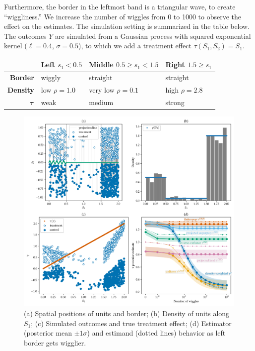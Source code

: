 \documentclass[letter]{article}
\makeatletter
\def\maxwidth{\ifdim\Gin@nat@width>\linewidth\linewidth
\else\Gin@nat@width\fi}
\let\Oldincludegraphics\includegraphics
\renewcommand{\includegraphics}[1]{\Oldincludegraphics[width=.8\maxwidth]{#1}}
\newcommand{\taubold}{\bm{\tau}}
\makeatother
\begin{document}
Furthermore, the border in the leftmost band is a triangular wave, to create ``wiggliness.''
We increase the number of wiggles from 0 to 1000 to observe the effect on the estimates.
The simulation setting is summarized in the table below.
The outcomes \(Y\) are simulated from a Gaussian process with squared exponential kernel
(\(\ell=0.4\), \(\sigma=0.5\)), to which we add a treatment effect \(\tau(S_1, S_2) = S_1\).
    


    	\begin{longtable}[]{@{}rlll@{}}
\toprule
& Left \(s_1< 0.5\) & Middle \(0.5 \ge s_1 < 1.5\) & Right \(1.5 \ge s_1\)\tabularnewline
\midrule
\endhead
\textbf{Border} & wiggly & straight & straight\tabularnewline
\textbf{Density} & low \(\rho=1.0\) & very low \(\rho=0.1\) & high \(\rho=2.8\)\tabularnewline
\(\taubold\) & weak & medium & strong\tabularnewline
\bottomrule
\end{longtable}
    


    	\begin{figure}
\centering
\includegraphics{figures/wiggly_boundaries.png}
\caption{\label{fig:wiggly_boundaries} (a) Spatial positions of units and border; (b) Density of units along \(S_1\); (c) Simulated outcomes and true treatment effect; (d) Estimator (posterior mean \(\pm 1 \sigma\)) and estimand (dotted lines) behavior as left border gets wigglier.}
\end{figure}
    
\end{document}
